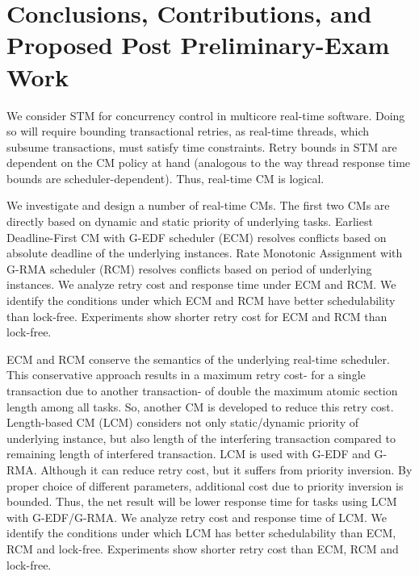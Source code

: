 \documentclass[12pt,english]{report}
\begin{document}
\thispagestyle{empty}



\pagestyle{myheadings}

\chapter{\label{conclusions}Conclusions, Contributions, and Proposed Post Preliminary-Exam Work}

We consider STM for concurrency control in multicore real-time software. Doing so will require bounding transactional  retries, as real-time threads, which subsume transactions, must satisfy time constraints.  Retry bounds in STM are dependent on the CM policy at hand (analogous to the way thread response time bounds are scheduler-dependent). Thus, real-time CM is logical.

We investigate and design a number of real-time CMs. The first two CMs are directly based on dynamic and static priority of underlying tasks. Earliest Deadline-First CM with G-EDF scheduler (ECM) resolves conflicts based on absolute deadline of the underlying instances. Rate Monotonic Assignment with G-RMA scheduler (RCM) resolves conflicts based on period of underlying instances. We analyze retry cost and response time under ECM and RCM. We identify the conditions under which ECM and RCM have better schedulability than lock-free. Experiments show shorter retry cost for ECM and RCM than lock-free.

ECM and RCM conserve the semantics of the underlying real-time scheduler. This conservative approach results in a maximum retry cost- for a single transaction due to another transaction- of double the maximum atomic section length among all tasks. So, another CM is developed to reduce this retry cost. Length-based CM (LCM) considers not only static/dynamic priority of underlying instance, but also length of the interfering transaction compared to remaining length of interfered transaction. LCM is used with G-EDF and G-RMA. Although it can reduce retry cost, but it suffers from priority inversion. By proper choice of different parameters, additional cost due to priority inversion is bounded. Thus, the net result will be lower response time for tasks using LCM with G-EDF/G-RMA. We analyze retry cost and response time of LCM. We identify the conditions under which LCM has better schedulability than ECM, RCM and lock-free. Experiments show shorter retry cost than ECM, RCM and lock-free.
\end{document}
